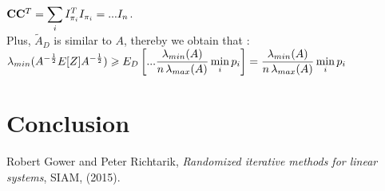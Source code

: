 $\bold{C} \bold{C}^{T}= \displaystyle\sum\limits_{i} I_{\pi_{i}}^{T} I_{\pi_{i}} = ... I_{n} $.\\
Plus, $\tilde{A}_{D}$ is similar to $A$, thereby we obtain that :\\ 


$\displaystyle \lambda_{min}(A^{-\frac12}E[Z]A^{-\frac12} )  \geqslant  \displaystyle E_{D}\left[ ...\frac{\lambda_{min}(A)}{n \,\lambda_{max}(A)}  \min_{i} p_{i} \right] = \frac{\lambda_{min}(A)}{n \,\lambda_{max}(A)}  \min_{i} p_{i} $

\chapter{Conclusion}

\appendix
\begin{thebibliography}{1}

\bibitem{}
{\sc Robert Gower and Peter Richtarik}, {\em Randomized iterative methods for linear systems}, SIAM, 
  (2015).



\end{thebibliography}





